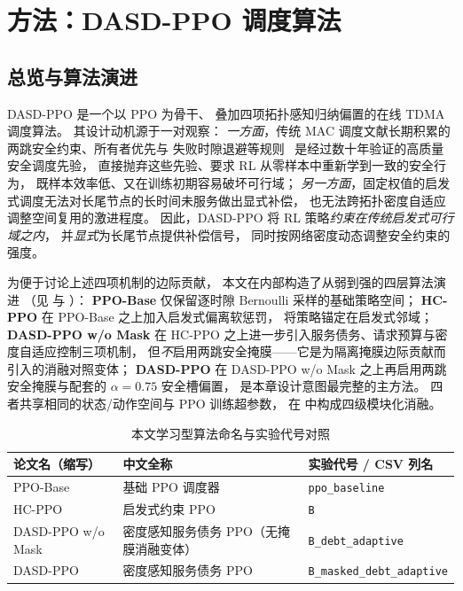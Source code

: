 \section{方法：DASD-PPO 调度算法}
\label{sec:method}

\subsection{总览与算法演进}
\label{subsec:overview}

DASD-PPO 是一个以 PPO 为骨干、
叠加四项拓扑感知归纳偏置的在线 TDMA 调度算法。
其设计动机源于一对观察：
\emph{一方面}，传统 MAC 调度文献长期积累的两跳安全约束、所有者优先与
失败时隙退避等规则~\cite{stdma,zmac,trama}
是经过数十年验证的高质量安全调度先验，
直接抛弃这些先验、要求 RL 从零样本中重新学到一致的安全行为，
既样本效率低、又在训练初期容易破坏可行域；
\emph{另一方面}，固定权值的启发式调度无法对长尾节点的长时间未服务做出显式补偿，
也无法跨拓扑密度自适应调整空间复用的激进程度。
因此，DASD-PPO 将 RL 策略\emph{约束在传统启发式可行域之内}，
并\emph{显式}为长尾节点提供补偿信号，
同时按网络密度动态调整安全约束的强度。

为便于讨论上述四项机制的边际贡献，
本文在内部构造了从弱到强的四层算法演进
（见  与 ）：
\textbf{PPO-Base} 仅保留逐时隙 Bernoulli 采样的基础策略空间；
\textbf{HC-PPO} 在 PPO-Base 之上加入启发式偏离软惩罚，
将策略锚定在启发式邻域；
\textbf{DASD-PPO w/o Mask} 在 HC-PPO 之上进一步引入服务债务、请求预算与密度自适应控制三项机制，
但\emph{不}启用两跳安全掩膜——它是为隔离掩膜边际贡献而引入的消融对照变体；
\textbf{DASD-PPO} 在 DASD-PPO w/o Mask 之上再启用两跳安全掩膜与配套的 \(\alpha=0.75\) 安全槽偏置，
是本章设计意图最完整的主方法。
四者共享相同的状态/动作空间与 PPO 训练超参数，
在  中构成四级模块化消融。

\begin{table}[H]
\centering
\caption{本文学习型算法命名与实验代号对照}
\label{tab:algo-naming}
\begin{tabular}{@{}lll@{}}
\toprule
\textbf{论文名}（缩写） & \textbf{中文全称} & \textbf{实验代号 / CSV 列名} \\
\midrule
PPO-Base          & 基础 PPO 调度器                        & \texttt{ppo\_baseline} \\
HC-PPO            & 启发式约束 PPO                         & \texttt{B} \\
DASD-PPO w/o Mask & 密度感知服务债务 PPO（无掩膜消融变体） & \texttt{B\_debt\_adaptive} \\
DASD-PPO          & 密度感知服务债务 PPO                   & \texttt{B\_masked\_debt\_adaptive} \\
\bottomrule
\end{tabular}
\end{table}

